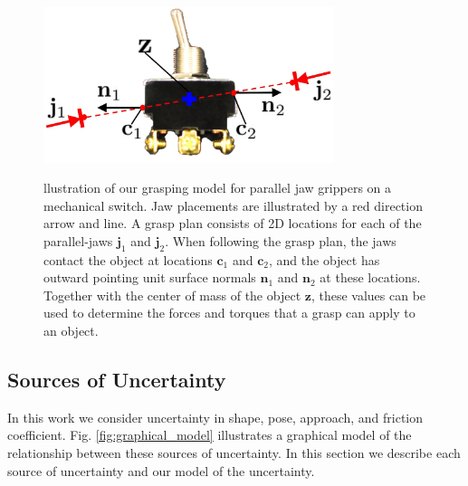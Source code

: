 \documentclass[10pt, conference]{ieeeconf}      %
\newcommand{\bc}{\mathbf{c}}
\newcommand{\bj}{\mathbf{j}}
\newcommand{\bn}{\mathbf{n}}
\newcommand{\bz}{\mathbf{z}}
\begin{document}

\begin{figure}[t!]
\centering
\includegraphics[width = 8.5cm, height = 5.25cm]{figures/bandit_grasp_model.jpg}
\caption{llustration of our grasping model for parallel jaw grippers on a mechanical switch. Jaw placements are illustrated by a red direction arrow and line. A grasp plan consists of 2D locations for each of the parallel-jaws $\bj_1$ and $\bj_2$. When following the grasp plan, the jaws contact the object at locations $\bc_1$ and $\bc_2$, and the object has outward pointing unit surface normals $\bn_1$ and $\bn_2$ at these locations. Together with the center of mass of the object $\bz$, these values can be used to determine the forces and torques that a grasp can apply to an object.}
\vspace*{-2ex}
\label{fig:grasp_model}
\end{figure}

\subsection{Sources of Uncertainty}
In this work we consider uncertainty in shape, pose, approach, and friction coefficient.
Fig. \ref{fig:graphical_model} illustrates a graphical model of the relationship between these sources of uncertainty.
In this section we describe each source of uncertainty and our model of the uncertainty.
\end{document}
